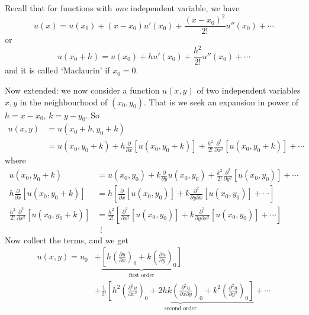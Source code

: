 \documentclass[12pt]{report}
\theoremstyle{definition}
\begin{document}
Recall that for functions with \emph{one} independent variable, we have\[
    u(x) = u(x_0) + (x-x_0)u'(x_0) + \frac{{(x-x_0)}^{2}}{2!}u''(x_0) +\cdots
\]or\[
u(x_0 + h) = u(x_0) + hu'(x_0) + \frac{h^{2}}{2!}u''(x_0) +\cdots
\]and it is called `Maclaurin' if $x_0 = 0$.

Now extended: we now consider a function $u(x,y)$ of two independent variables $x,y$
in the neighbourhood of $(x_0,y_0)$. That is we seek an expansion in power of $h = x-x_0$,
$k = y-y_0$. So\[
    \begin{align*}
        u(x,y) & = u(x_0 + h, y_0 + k) \\
               & = u(x_0, y_0 + k) + h\frac{\partial}{\partial x} [u(x_0, y_0 + k)]
               + \frac{h^{2}}{2!} \frac{\partial^{2}}{\partial x^{2}} [u(x_0, y_0 + k)] + \cdots
    \end{align*}
\]where\[
    \begin{align*}
        u(x_0, y_0 + k) & = u(x_0, y_0) + k\frac{\partial}{\partial y} u(x_0, y_0)
        + \frac{k^{2}}{2!}\frac{\partial^{2}}{\partial y^{2}} [u(x_0, y_0)] + \cdots \\
        h\frac{\partial}{\partial x} [u(x_0, y_0 + k)]
                        & = h\left[\frac{\partial}{\partial x} [u(x_0, y_0)]
                        + k\frac{\partial^{2}}{\partial y \partial x} [u(x_0, y_0)] + \cdots\right] \\
        \frac{h^{2}}{2!} \frac{\partial^{2}}{\partial x^{2}} [u(x_0, y_0 + k)]
                        & = \frac{h^{2}}{2!}\left[\frac{\partial^{2}}{\partial x^{2}} [u(x_0, y_0)]
                        + k\frac{\partial^{3}}{\partial y \partial x^{2}} [u(x_0, y_0)] + \cdots\right] \\
                        & \;\,\vdots
    \end{align*}
\]Now collect the terms, and we get
\begin{equation}\label{PDE:1}
\begin{align*}
u(x,y) = u_0 
& + \underbrace{\left[h{\left(\frac{\partial u}{\partial x} \right)}_{0}
+ k{\left(\frac{\partial u}{\partial y} \right)}_{0}\right]}_\text{first order} \\
& + \frac{1}{2!}\underbrace{\left[h^{2}{\left(\frac{\partial^{2}u}{\partial x^{2}} \right)}_{0}
+ 2hk{\left(\frac{\partial^{2}u}{\partial x \partial y} \right)}_{0}
+ k^{2}{\left(\frac{\partial^{2}u}{\partial y^{2}} \right)}_{0}\right]}_\text{second order} + \cdots
\end{align*}
\end{equation}
\end{document}
